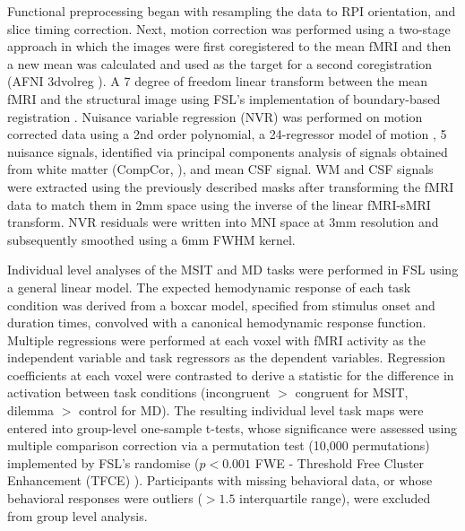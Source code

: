 Functional preprocessing began with resampling the data to RPI orientation, and slice timing correction. Next, motion correction was performed using a two-stage approach in which the images were first coregistered to the mean fMRI and then a new mean was calculated and used as the target for a second coregistration (AFNI 3dvolreg \cite{Cox1999}). A 7 degree of freedom linear transform between the mean fMRI and the structural image using FSL’s implementation of boundary-based registration \cite{Greve2009}. Nuisance variable regression (NVR) was performed on motion corrected data using a 2nd order polynomial, a 24-regressor model of motion \cite{Friston1996}, 5 nuisance signals, identified via principal components analysis of signals obtained from white matter (CompCor, \cite{Behzadi2007}), and mean CSF signal. WM and CSF signals were extracted using the previously described masks after transforming the fMRI data to match them in 2mm space using the inverse of the linear fMRI-sMRI transform. NVR residuals were written into MNI space at 3mm resolution and subsequently smoothed using a 6mm FWHM kernel.

Individual level analyses of the MSIT and MD tasks were performed in FSL using a general linear model. The expected hemodynamic response of each task condition was derived from a boxcar model, specified from stimulus onset and duration times, convolved with a canonical hemodynamic response function. Multiple regressions were performed at each voxel with fMRI activity as the independent variable and task regressors as the dependent variables. Regression coefficients at each voxel were contrasted to derive a statistic for the difference in activation between task conditions (incongruent $>$ congruent for MSIT, dilemma $>$ control for MD). The resulting individual level task maps were entered into group-level one-sample t-tests, whose significance were assessed using multiple comparison correction via a permutation test (10,000 permutations) implemented by FSL’s randomise ($p<0.001$ FWE - Threshold Free Cluster Enhancement (TFCE) \cite{Salimi-Khorshidi2011}). Participants with missing behavioral data, or whose behavioral responses were outliers ($>1.5$ interquartile range), were excluded from group level analysis.


